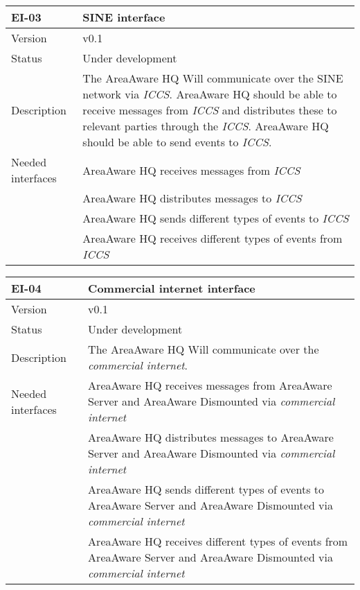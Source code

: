 \begin{longtable}{| p{3.5cm} |  p{10cm} | }
	\hline
	\textbf{EI-03} &  \textbf{SINE interface} \\
	\hline
	Version & v0.1 \\
	\hline
	Status & Under development \\
	\hline
	Description & The AreaAware HQ Will communicate over the SINE network via \emph{ICCS}\citep{iccs}. AreaAware HQ should be able to receive messages from \emph{ICCS} and distributes these to relevant parties through the \emph{ICCS}. AreaAware HQ should be able to send events to \emph{ICCS}.
	\\
	\hline
	Needed interfaces 
	& AreaAware HQ receives messages from \emph{ICCS} \\
	& AreaAware HQ distributes messages to \emph{ICCS} \\
	& AreaAware HQ sends different types of events to \emph{ICCS} \\
	& AreaAware HQ receives different types of events from \emph{ICCS} \\
	\hline
\end{longtable}

\begin{longtable}{| p{3.5cm} |  p{10cm} | }
	\hline
	\textbf{EI-04} &  \textbf{Commercial internet interface} \\
	\hline
	Version & v0.1 \\
	\hline
	Status & Under development \\
	\hline
	Description & The AreaAware HQ Will communicate over the \emph{commercial internet}.
	\\
	\hline
	Needed interfaces 
	& AreaAware HQ receives messages from AreaAware Server and AreaAware Dismounted via \emph{commercial internet} \\
	& AreaAware HQ distributes messages to AreaAware Server and AreaAware Dismounted via \emph{commercial internet} \\ 
	& AreaAware HQ sends different types of events to AreaAware Server and AreaAware Dismounted via \emph{commercial internet} \\
	& AreaAware HQ receives different types of events from AreaAware Server and AreaAware Dismounted via \emph{commercial internet} \\
	\hline
\end{longtable}

